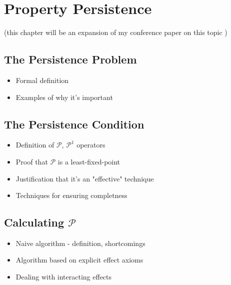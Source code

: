 \chapter{Property Persistence}\label{ch:persistence}

(this chapter will be an expansion of my conference paper on this topic \cite{kelly07sc_persistence})


\section{The Persistence Problem}

\begin{itemize}
\item Formal definition
\item Examples of why it's important
\end{itemize}

\section{The Persistence Condition}

\begin{itemize}
\item Definition of $\mathcal{P}$, $\mathcal{P}^{1}$ operators
\item Proof that $\mathcal{P}$ is a least-fixed-point
\item Justification that it's an "effective" technique
\item Techniques for ensuring completness
\end{itemize}

\section{Calculating $\mathcal{P}$}

\begin{itemize}
\item Naive algorithm - definition, shortcomings
\item Algorithm based on explicit effect axioms
\item Dealing with interacting effects
\end{itemize}


